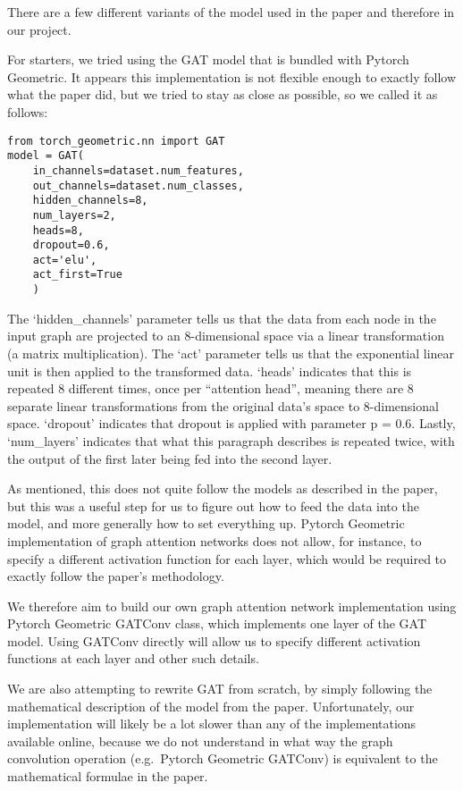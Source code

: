 There are a few different variants of the model used in the paper and
therefore in our project.

For starters, we tried using the GAT model that is bundled with Pytorch
Geometric.
It appears this implementation is not flexible enough to exactly
follow what the paper did, but we tried to stay as close as possible, so we
called it as follows:

\begin{verbatim}
from torch_geometric.nn import GAT
model = GAT(
    in_channels=dataset.num_features,
    out_channels=dataset.num_classes,
    hidden_channels=8,
    num_layers=2,
    heads=8,
    dropout=0.6,
    act='elu',
    act_first=True
    )
\end{verbatim}



The `hidden\_channels' parameter tells us that the data from each node in the
input graph are projected to an 8-dimensional space via a linear
transformation (a matrix multiplication).
The `act' parameter tells us that
the exponential linear unit is then applied to the transformed data.
`heads' indicates that this is repeated 8 different times, once per ``attention head'',
meaning there are 8 separate linear transformations from the original data's
space to 8-dimensional space.
`dropout' indicates that dropout is applied with
parameter p = 0.6. Lastly, `num\_layers' indicates that what this paragraph
describes is repeated twice, with the output of the first later being fed into
the second layer.

As mentioned, this does not quite follow the models as described in the paper,
but this was a useful step for us to figure out how to feed the data into the
model, and more generally how to set everything up.
Pytorch Geometric implementation of graph attention networks does not allow, for instance, to
specify a different activation function for each layer, which would be
required to exactly follow the paper's methodology.

We therefore aim to build our own graph attention network implementation using
Pytorch Geometric GATConv class, which implements one layer of the GAT
model.
Using GATConv directly will allow us to specify different activation
functions at each layer and other such details.

We are also attempting to rewrite GAT from scratch, by simply following the
mathematical description of the model from the paper.
Unfortunately, our implementation will likely be a lot slower than any of the implementations
available online, because we do not understand in what way the graph
convolution operation (e.g.\ Pytorch Geometric GATConv) is equivalent to the
mathematical formulae in the paper.
